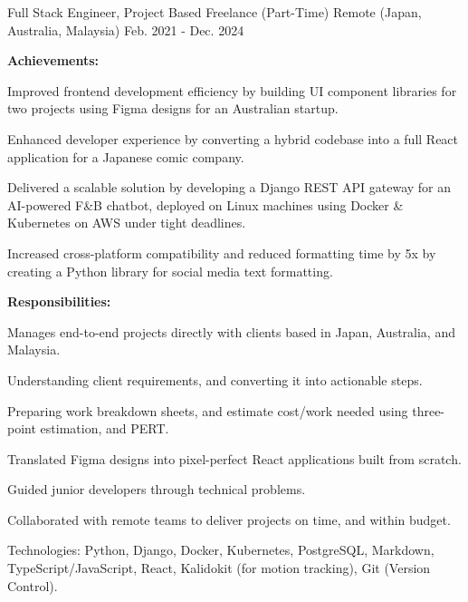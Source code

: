 

\begin{cventries}


  \cventry
    {Full Stack Engineer, Project Based} %
    {Freelance (Part-Time)} %
    {Remote (Japan, Australia, Malaysia)} %
    {Feb. 2021 - Dec. 2024} %
    {
      \textbf{Achievements:}
      \vspace{1.5em}
      \begin{cvitems} %
        \item {Improved frontend development efficiency by building UI component libraries for two projects using Figma designs for an Australian startup.}
        \item {Enhanced developer experience by converting a hybrid codebase into a full React application for a Japanese comic company.}
        \item {Delivered a scalable solution by developing a Django REST API gateway for an AI-powered F\&B chatbot, deployed on Linux machines using Docker \& Kubernetes on AWS under tight deadlines.}
        \item {Increased cross-platform compatibility and reduced formatting time by 5x by creating a Python library for social media text formatting.}
      \end{cvitems}
      \vspace{1.5em}
      \textbf{Responsibilities:}
      \vspace{1.5em}
      \begin{cvitems} %
        \item {Manages end-to-end projects directly with clients based in Japan, Australia, and Malaysia.}
        \item {Understanding client requirements, and converting it into actionable steps.}
        \item {Preparing work breakdown sheets, and estimate cost/work needed using three-point estimation, and PERT.}
        \item {Translated Figma designs into pixel-perfect React applications built from scratch.}
        \item {Guided junior developers through technical problems.}
        \item {Collaborated with remote teams to deliver projects on time, and within budget.}
        \item {Technologies: Python, Django, Docker, Kubernetes, PostgreSQL, Markdown, TypeScript/JavaScript, React, Kalidokit (for motion tracking), Git (Version Control).}
      \end{cvitems}
    }


\end{cventries}
